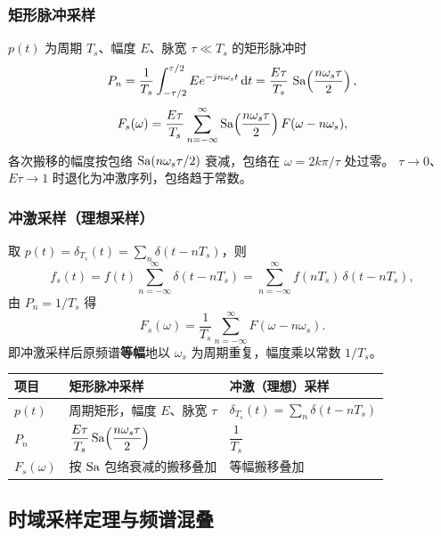 \subsubsection{矩形脉冲采样}
$p(t)$ 为周期 $T_s$、幅度 $E$、脉宽 $\tau\ll T_s$ 的矩形脉冲时
\begin{equation}
P_n=\frac{1}{T_s}\int_{-\tau/2}^{\tau/2}E e^{-jn\omega_s t}\,\mathrm{d}t
=\frac{E\tau}{T_s}\,\operatorname{Sa}\!\left(\frac{n\omega_s\tau}{2}\right),
\end{equation}
\begin{equation}
F_s(\omega)=\frac{E\tau}{T_s}\sum_{n=-\infty}^{\infty}
\operatorname{Sa}\!\left(\frac{n\omega_s\tau}{2}\right)F(\omega-n\omega_s),
\end{equation}
各次搬移的幅度按包络 $\operatorname{Sa}(n\omega_s\tau/2)$ 衰减，包络在 $\omega=2k\pi/\tau$ 处过零。
$\tau\to0$、$E\tau\to1$ 时退化为冲激序列，包络趋于常数。

\subsubsection{冲激采样（理想采样）}
取 $p(t)=\delta_{T_s}(t)=\sum_n\delta(t-nT_s)$，则
\begin{equation}
f_s(t)=f(t)\sum_{n=-\infty}^{\infty}\delta(t-nT_s)
=\sum_{n=-\infty}^{\infty}f(nT_s)\,\delta(t-nT_s),
\end{equation}
由 $P_n=1/T_s$ 得
\begin{equation}
F_s(\omega)=\frac{1}{T_s}\sum_{n=-\infty}^{\infty}F(\omega-n\omega_s).
\end{equation}
即冲激采样后原频谱\textbf{等幅}地以 $\omega_s$ 为周期重复，幅度乘以常数 $1/T_s$。

\begin{center}
\begin{tabular}{lll}
\toprule
项目 & 矩形脉冲采样 & 冲激（理想）采样 \\
\midrule
$p(t)$ & 周期矩形，幅度 $E$、脉宽 $\tau$ & $\delta_{T_s}(t)=\sum_n\delta(t-nT_s)$ \\
$P_n$ & $\dfrac{E\tau}{T_s}\operatorname{Sa}\!\left(\dfrac{n\omega_s\tau}{2}\right)$ & $\dfrac{1}{T_s}$ \\
$F_s(\omega)$ & 按 $\operatorname{Sa}$ 包络衰减的搬移叠加 & 等幅搬移叠加 \\
\bottomrule
\end{tabular}
\end{center}

\subsection{时域采样定理与频谱混叠}

